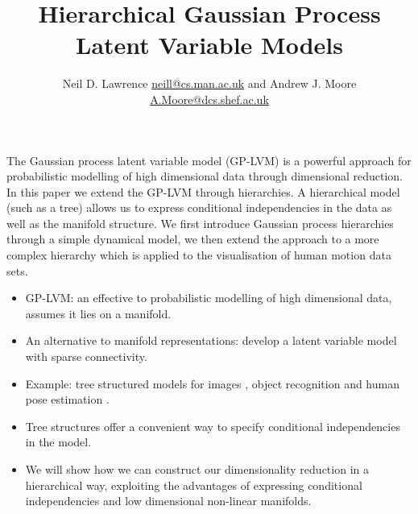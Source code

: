 \documentclass[english,color,smalltitle]{manchesterposter}
\begin{document}
\title{Hierarchical Gaussian Process Latent Variable Models}


\author{Neil D. Lawrence \url{neill@cs.man.ac.uk} and Andrew J. Moore \url{A.Moore@dcs.shef.ac.uk}}

\maketitle
\begin{multicols}{5}{\LARGE \par}

\begin{columnbox}
\-


\medskip{}
The Gaussian process latent variable model (GP-LVM) is a powerful
approach for probabilistic modelling of high dimensional data through
dimensional reduction. In this paper we extend the GP-LVM through
hierarchies. A hierarchical model (such as a tree) allows us to express
conditional independencies in the data as well as the manifold structure.
We first introduce Gaussian process hierarchies through a simple dynamical
model, we then extend the approach to a more complex hierarchy which
is applied to the visualisation of human motion data sets.{\large \par}

\end{columnbox}


\begin{columnbox}
\-


\begin{itemize}
\item GP-LVM: an effective to probabilistic modelling of high dimensional
data, assumes it lies on a manifold.{\large \par}
\item An alternative to manifold representations: develop a latent variable
model with sparse connectivity.{\large \par}
\item Example: tree structured models for images \citep{Williams:tree98,Feng:combining02,Awasthi:image07},
object recognition \citep{Felzenszwalb:efficient00,Ioffe:mixtures01}
and human pose estimation \citep{Ramanan:finding03,Sigal:loose04,Lan:beyond05}.{\large \par}
\item Tree structures  offer a convenient way to specify conditional independencies
in the model. {\large \par}
\item We will show how we can construct our dimensionality reduction in
a hierarchical way, exploiting the advantages of expressing conditional
independencies and low dimensional non-linear manifolds.{\large \par}
\end{itemize}
\end{columnbox}



\end{multicols}
\end{document}
